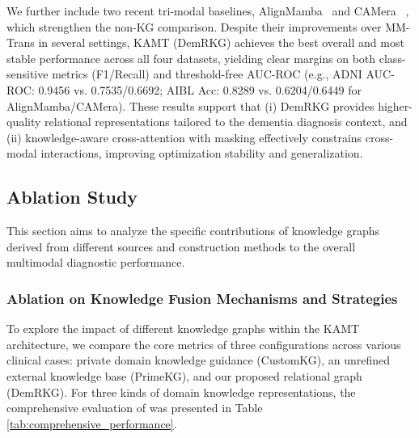 \documentclass[lettersize,journal]{IEEEtran}
\begin{document}
    We further include two recent tri-modal baselines, AlignMamba~\cite{li2025alignmamba} and CAMera~\cite{hu2025camera} , which strengthen the non-KG comparison. Despite their improvements over MM-Trans in several settings, KAMT (DemRKG) achieves the best overall and most stable performance across all four datasets, yielding clear margins on both class-sensitive metrics (F1/Recall) and threshold-free AUC-ROC (e.g., ADNI AUC-ROC: 0.9456 vs. 0.7535/0.6692; AIBL Acc: 0.8289 vs. 0.6204/0.6449 for AlignMamba/CAMera). These results support that (i) DemRKG provides higher-quality relational representations tailored to the dementia diagnosis context, and (ii) knowledge-aware cross-attention with masking effectively constrains cross-modal interactions, improving optimization stability and generalization.


\subsection{Ablation Study}

This section aims to analyze the specific contributions of knowledge graphs derived from different sources and construction methods to the overall multimodal diagnostic performance.

\subsubsection{Ablation on Knowledge Fusion Mechanisms and Strategies}

    To explore the impact of different knowledge graphs within the KAMT architecture, we compare the core metrics of three configurations across various clinical cases: private domain knowledge guidance (CustomKG), an unrefined external knowledge base (PrimeKG), and our proposed relational graph (DemRKG). For three kinds of domain knowledge representations, the comprehensive evaluation of was presented in Table \ref{tab:comprehensive_performance}.
\end{document}
